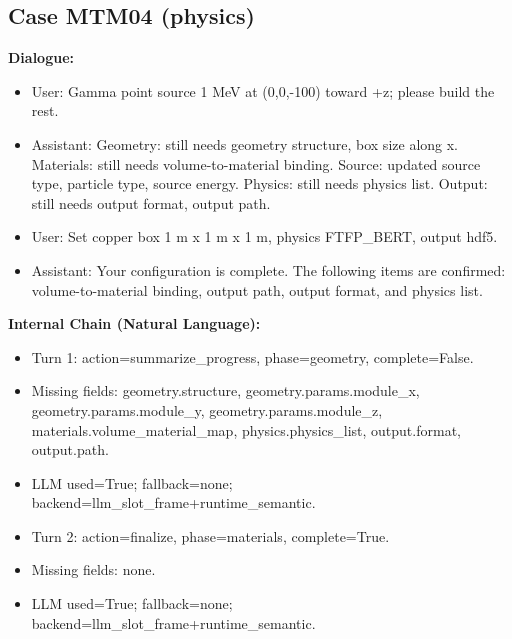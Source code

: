 \documentclass[11pt]{ctexart}
\begin{document}
\subsection{Case MTM04 (physics)}
\textbf{Dialogue:}
\begin{itemize}
\item User: Gamma point source 1 MeV at (0,0,-100) toward +z; please build the rest.
\item Assistant: Geometry: still needs geometry structure, box size along x. Materials: still needs volume-to-material binding. Source: updated source type, particle type, source energy. Physics: still needs physics list. Output: still needs output format, output path.
\item User: Set copper box 1 m x 1 m x 1 m, physics FTFP\_BERT, output hdf5.
\item Assistant: Your configuration is complete. The following items are confirmed: volume-to-material binding, output path, output format, and physics list.
\end{itemize}
\textbf{Internal Chain (Natural Language):}
\begin{itemize}
\item Turn 1: action=summarize\_progress, phase=geometry, complete=False.
\item Missing fields: geometry.structure, geometry.params.module\_x, geometry.params.module\_y, geometry.params.module\_z, materials.volume\_material\_map, physics.physics\_list, output.format, output.path.
\item LLM used=True; fallback=none; backend=llm\_slot\_frame+runtime\_semantic.
\item Turn 2: action=finalize, phase=materials, complete=True.
\item Missing fields: none.
\item LLM used=True; fallback=none; backend=llm\_slot\_frame+runtime\_semantic.
\end{itemize}
\end{document}
